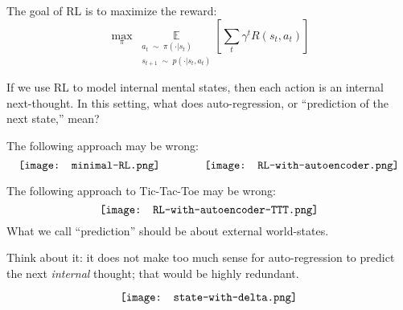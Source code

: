 The goal of RL is to maximize the reward:
\begin{equation}
\max_{\pi} \; \underset{\substack{a_t \;\sim\; \pi(\cdot | s_t) \\ s_{t+1} \;\sim\; p(\cdot | s_t, a_t) }} {\mathbb{E}} \left[ \sum_{t} \gamma^t R(s_t, a_t) \right]
\end{equation}

If we use RL to model internal mental states, then each action is an internal next-thought.  In this setting, what does auto-regression, or ``prediction of the next state,'' mean?

The following approach may be wrong:
\begin{equation}
\vcenter{\hbox{\texttt{[image: minimal-RL.png]}}}
\qquad \qquad
\vcenter{\hbox{\texttt{[image: RL-with-autoencoder.png]}}}
\end{equation}

The following approach to Tic-Tac-Toe may be wrong:
\begin{equation}
\vcenter{\hbox{\texttt{[image: RL-with-autoencoder-TTT.png]}}}
\end{equation}
What we call ``prediction'' should be about external world-states.  

Think about it:  it does not make too much sense for auto-regression to predict the next \textit{internal} thought;  that would be highly redundant.

\begin{equation}
\vcenter{\hbox{\texttt{[image: state-with-delta.png]}}}
\end{equation}

